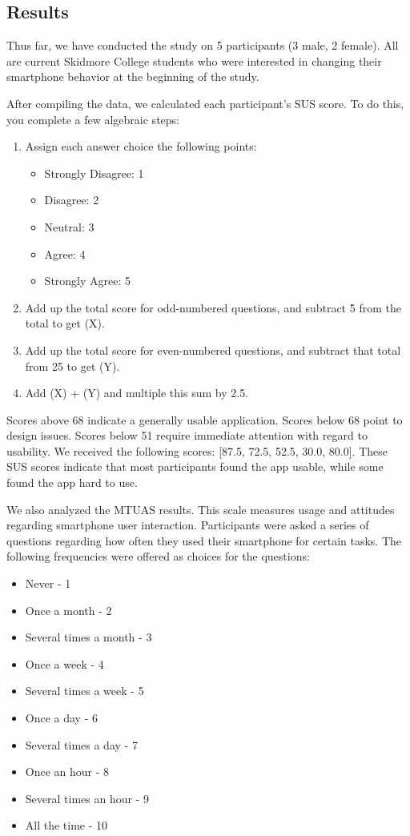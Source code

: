 \documentclass[12pt, title page, manuscript, nonacm]{acmart}
\begin{document}
\subsection*{Results}
Thus far, we have conducted the study on 5 participants (3 male, 2 female). All are current Skidmore College students who were interested in changing their smartphone behavior at the beginning of the study. 
\par After compiling the data, we calculated each participant's SUS score. To do this, you complete a few algebraic steps:
\begin{enumerate}
    \item Assign each answer choice the following points: \begin{itemize}
        \item Strongly Disagree: 1
        \item Disagree: 2
        \item Neutral: 3
        \item Agree: 4
        \item Strongly Agree: 5
    \end{itemize}
    \item Add up the total score for odd-numbered questions, and subtract 5 from the total to get (X).
    \item Add up the total score for even-numbered questions, and subtract that total from 25 to get (Y).
    \item Add (X) + (Y) and multiple this sum by 2.5.
\end{enumerate}
Scores above 68 indicate a generally usable application. Scores below 68 point to design issues. Scores below 51 require immediate attention with regard to usability. We received the following scores: [87.5, 72.5, 52.5, 30.0, 80.0]. These SUS scores indicate that most participants found the app usable, while some found the app hard to use. 
\par We also analyzed the MTUAS results. This scale measures usage and attitudes regarding smartphone user interaction. Participants were asked a series of questions regarding how often they used their smartphone for certain tasks. The following frequencies were offered as choices for the questions: 
\begin{itemize}
    \item Never - 1
    \item Once a month - 2
    \item Several times a month - 3
    \item Once a week - 4
    \item Several times a week - 5
    \item Once a day - 6
    \item Several times a day - 7
    \item Once an hour - 8
    \item Several times an hour - 9
    \item All the time - 10
\end{itemize}
\end{document}
